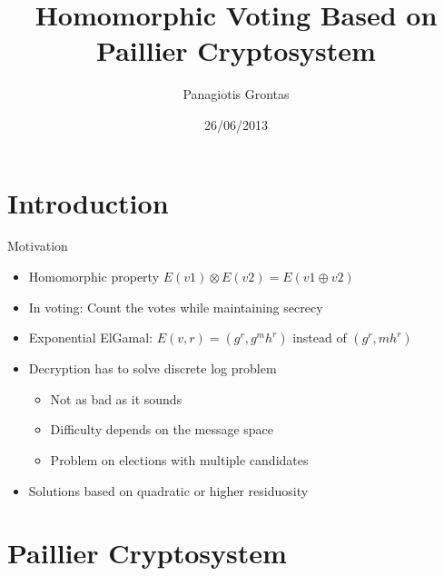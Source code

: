 \documentclass{beamer}
\title{Homomorphic Voting Based on Paillier Cryptosystem}
\author{Panagiotis Grontas}
\date{26/06/2013}
\institute{$\mu\Pi\lambda\forall$  - CoReLab Crypto Group}
\begin{document}
\newcommand{\zns}[1]{ \mathbb{Z}_{#1}^* }
\newcommand{\md}[1]{\quad (mod \, {#1})}
\begin{frame}
\titlepage
\end{frame}

\section{Introduction}

\begin{frame}{Motivation}
\begin{itemize}
\item Homomorphic property $E(v1) \otimes E(v2) = E(v1 \oplus v2)$
\item In voting: Count the votes while maintaining secrecy
\item Exponential ElGamal: $E(v,r) = (g^r, g^m  h^r)$ instead of $(g^r, m  h^r)$
\item Decryption has to solve discrete log problem
\begin{itemize}
	\item Not as bad as it sounds
	\item Difficulty depends on the message space
	\item Problem on elections with multiple candidates
\end{itemize}
\item Solutions based on quadratic or higher residuosity
\end{itemize}
\end{frame}

\section{Paillier Cryptosystem}
\end{document}
